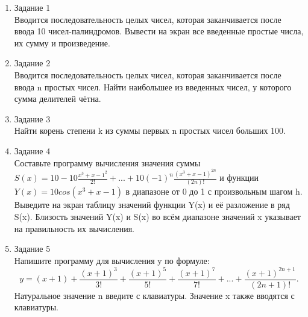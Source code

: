 \documentclass[a4paper]{article}
\begin{document}
	
	\begin{enumerate} 
		\item Задание 1 \\
		Вводится последовательность целых чисел, которая заканчивается после ввода 10 чисел-палиндромов. Вывести на экран все введенные простые числа, их сумму и произведение.\\
		\item Задание 2\\
		Вводится последовательность целых чисел, которая заканчивается после ввода n простых чисел. Найти наибольшее из введенных чисел, у которого сумма делителей чётна.\\
		\item Задание 3 \\
		Найти корень степени k из суммы первых n простых чисел больших 100.\\
		\item Задание 4 \\ 
		Составьте программу вычисления значения суммы  $S(x)=10-10\frac{{x^3+x-1}^2}{2!}+...+10(-1)^n\frac{{(x^3+x-1)}^{2n}}{(2n)!}$
		и функции $Y(x)=10cos(x^3+x-1)$ в диапазоне от 0 до 1
		с произвольным шагом h. Выведите на экран таблицу значений функции Y(x) и её разложение в ряд S(x). Близость значений Y(x) и S(x) во всём диапазоне
		значений x указывает на правильность их вычисления.\\
		\item Задание 5 \\
		Напишите программу для вычисления y по формуле:\\
		$$y=(x+1)+\frac{(x+1)^3}{3!}+\frac{(x+1)^5}{5!}+\frac{(x+1)^7}{7!}+...+\frac{(x+1)^{2n+1}}{(2n+1)!}.$$
		Натуральное значение n введите с клавиатуры. Значение x также вводятся с клавиатуры.\\
		
	\end{enumerate}
\end{document}
